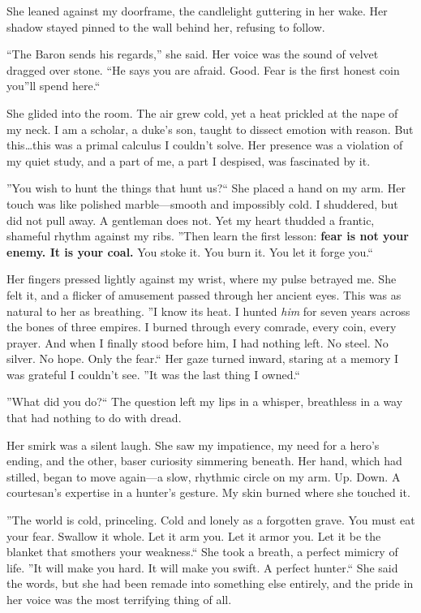 \documentclass[11pt]{article}
\begin{document}
She leaned against my doorframe, the candlelight guttering in her wake. Her shadow stayed pinned to the wall behind her, refusing to follow.

``The Baron sends his regards,'' she said. Her voice was the sound of velvet dragged over stone. ``He says you are afraid. Good. Fear is the first honest coin you''ll spend here.``

She glided into the room. The air grew cold, yet a heat prickled at the nape of my neck. I am a scholar, a duke's son, taught to dissect emotion with reason. But this\dots this was a primal calculus I couldn't solve. Her presence was a violation of my quiet study, and a part of me, a part I despised, was fascinated by it.

''You wish to hunt the things that hunt us?`` She placed a hand on my arm. Her touch was like polished marble---smooth and impossibly cold. I shuddered, but did not pull away. A gentleman does not. Yet my heart thudded a frantic, shameful rhythm against my ribs. ''Then learn the first lesson: \textbf{fear is not your enemy. It is your coal.} You stoke it. You burn it. You let it forge you.``

Her fingers pressed lightly against my wrist, where my pulse betrayed me. She felt it, and a flicker of amusement passed through her ancient eyes. This was as natural to her as breathing. ''I know its heat. I hunted \textit{him} for seven years across the bones of three empires. I burned through every comrade, every coin, every prayer. And when I finally stood before him, I had nothing left. No steel. No silver. No hope. Only the fear.`` Her gaze turned inward, staring at a memory I was grateful I couldn't see. ''It was the last thing I owned.``

''What did you do?`` The question left my lips in a whisper, breathless in a way that had nothing to do with dread.

Her smirk was a silent laugh. She saw my impatience, my need for a hero's ending, and the other, baser curiosity simmering beneath. Her hand, which had stilled, began to move again---a slow, rhythmic circle on my arm. Up. Down. A courtesan's expertise in a hunter's gesture. My skin burned where she touched it.

''The world is cold, princeling. Cold and lonely as a forgotten grave. You must eat your fear. Swallow it whole. Let it arm you. Let it armor you. Let it be the blanket that smothers your weakness.`` She took a breath, a perfect mimicry of life. ''It will make you hard. It will make you swift. A perfect hunter.`` She said the words, but she had been remade into something else entirely, and the pride in her voice was the most terrifying thing of all.
\end{document}

